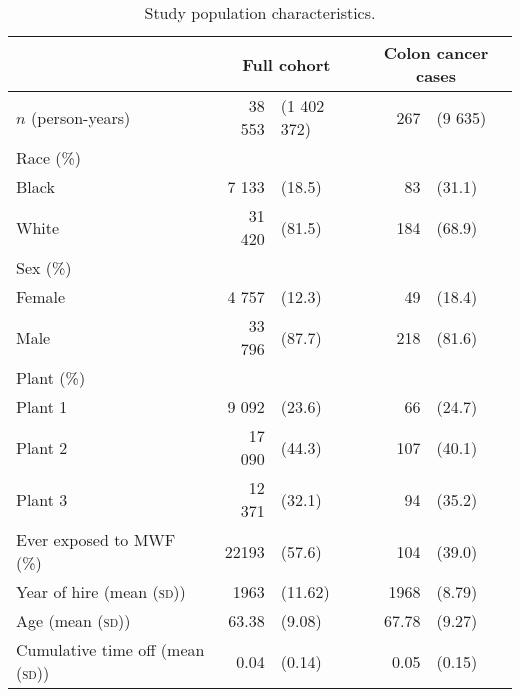 \documentclass[
  11pt,
]{article}
\begin{document}
\begin{table}[h]
\caption{Study population characteristics.}
\label{tab:popchar}
\begin{center}\begin{tabular}{lrlrl}
\toprule
&       \multicolumn{2}{c}{Full cohort}       & \multicolumn{2}{c}{Colon cancer cases}      \\
\midrule
$n$ (person-years) 
            &     38 553 & (1 402 372)       & 267 & (9 635)        \\
Race (\%) \\
\hspace{1.5em} Black   &      7 133 & (18.5)                &  83 & (31.1)          \\
\hspace{1.5em} White   &     31 420 & (81.5)                & 184 & (68.9)          \\
Sex (\%) \\
\hspace{1.5em} Female  &      4 757 & (12.3)                &  49 & (18.4)      \\
\hspace{1.5em} Male    &     33 796 & (87.7)                & 218 & (81.6)      \\
Plant (\%) \\
\hspace{1.5em} Plant 1 &      9 092 & (23.6)                &  66 & (24.7)      \\
\hspace{1.5em} Plant 2 &     17 090 & (44.3)                & 107 & (40.1)      \\
\hspace{1.5em} Plant 3 &     12 371 & (32.1)                &  94 & (35.2)          \\
\midrule
Ever exposed to MWF (\%)
                        &     22193 & (57.6)                & 104 & (39.0)          \\
Year of hire (mean (\textsc{sd}))
                        &     1963 & (11.62)            & 1968 & (8.79)         \\
Age (mean (\textsc{sd}))
                        &     63.38 & (9.08)                & 67.78 & (9.27)        \\
Cumulative time off (mean (\textsc{sd}))
                        &     0.04 & (0.14)               & 0.05 & (0.15)       \\
\bottomrule
\end{tabular}\end{center}
\end{table}
\end{document}
